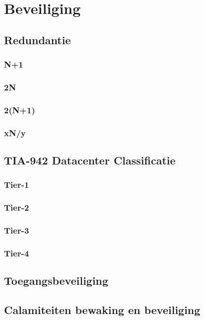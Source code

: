 \documentclass[a4paper,12pt,twoside,openright,titlepage]{book}
\begin{document}
\chapter{Beveiliging}
\section{Redundantie}

\subsection{N+1}

\subsection{2N}

\subsection{2(N+1)}

\subsection{xN/y}

\section{TIA-942 Datacenter Classificatie}

\subsection{Tier-1}

\subsection{Tier-2}

\subsection{Tier-3}

\subsection{Tier-4}

\section{Toegangsbeveiliging}

\section{Calamiteiten bewaking en beveiliging}

\end{document}
